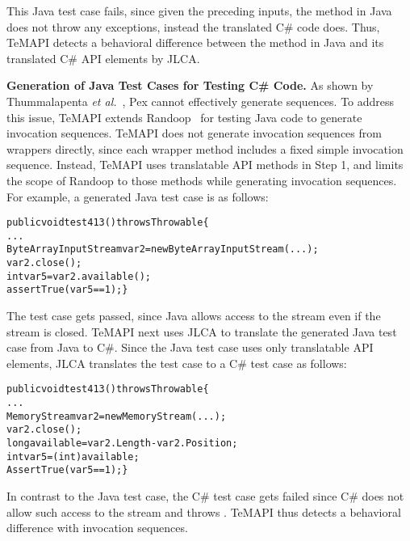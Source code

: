 This Java test case fails, since given the preceding inputs, the  method in Java does not throw any exceptions, instead the translated C\# code does. Thus, TeMAPI detects a behavioral difference between the  method in Java and its translated C\# API elements by JLCA.

\textbf{Generation of Java Test Cases for Testing C\# Code.} As shown by Thummalapenta \emph{et al.}~\cite{thummalapenta09:mseqgen}, Pex cannot effectively generate sequences. To address this issue, TeMAPI extends Randoop~\cite{pacheco2007feedback} for testing Java code to generate invocation sequences. TeMAPI does not generate invocation sequences from wrappers directly, since each wrapper method includes a fixed simple invocation sequence. Instead, TeMAPI uses translatable API methods in Step 1, and limits the scope of Randoop to those methods while generating invocation sequences. For example, a generated Java test case is as follows:

\begin{CodeOut}\vspace*{-1.5ex}
\begin{alltt}
public void test413() throws Throwable\{
  ...
  ByteArrayInputStream var2=new ByteArrayInputStream(...);
  var2.close();
  int var5=var2.available();
  assertTrue(var5 == 1);\}
\end{alltt}
\end{CodeOut}\vspace*{-2ex}


The test case gets passed, since Java allows access to the stream even if the stream is closed. TeMAPI next uses JLCA to translate the generated Java test case from Java to C\#. Since the Java test case uses only translatable API elements, JLCA translates the test case to a C\# test case as follows:

\begin{CodeOut}\vspace*{-1.5ex}
\begin{alltt}
public void test413() throws Throwable\{
  ...
  MemoryStream var2 = new MemoryStream(...);
  var2.close();
  long available = var2.Length - var2.Position;
  int var5 = (int) available;
  AssertTrue(var5 == 1);\}
\end{alltt}
\end{CodeOut}\vspace*{-2ex}

In contrast to the Java test case, the C\# test case gets failed since C\# does not allow such access to the stream and throws . TeMAPI thus detects a behavioral difference with invocation sequences.

